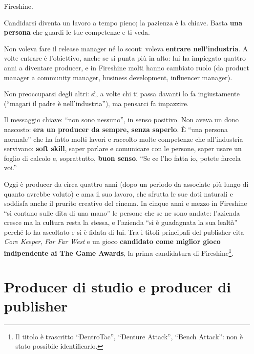 \begin{description}
        Fireshine.
  \item[Non succederà in una notte.] Candidarsi diventa un lavoro a tempo pieno;
        la pazienza è la chiave. Basta \textbf{una persona} che guardi le tue
        competenze e ti veda.
  \item[Sii tattico.] Non voleva fare il release manager né lo scout: voleva
        \textbf{entrare nell'industria}. A volte entrare è l'obiettivo, anche se si
        punta più in alto: lui ha impiegato quattro anni a diventare producer, e in
        Fireshine molti hanno cambiato ruolo (da product manager a community
        manager, business development, influencer manager).
  \item[Non è una gara.] Non preoccuparsi degli altri: sì, a volte chi ti passa
        davanti lo fa ingiustamente (``magari il padre è nell'industria''), ma
        pensarci fa impazzire.
\end{description}

Il messaggio chiave: ``non sono nessuno'', in senso positivo. Non aveva un dono
nascosto: \textbf{era un producer da sempre, senza saperlo}. È ``una persona
normale'' che ha fatto molti lavori e raccolto molte competenze che all'industria
servivano: \textbf{soft skill}, saper parlare e comunicare con le persone, saper
usare un foglio di calcolo e, soprattutto, \textbf{buon senso}. ``Se ce l'ho fatta
io, potete farcela voi.''

Oggi è producer da circa quattro anni (dopo un periodo da associate più lungo di
quanto avrebbe voluto) e ama il suo lavoro, che sfrutta le sue doti naturali e
soddisfa anche il prurito creativo del cinema. In cinque anni e mezzo in Fireshine
``si contano sulle dita di una mano'' le persone che se ne sono andate: l'azienda
cresce ma la cultura resta la stessa, e l'azienda ``si è guadagnata la sua
lealtà'' perché lo ha ascoltato e si è fidata di lui. Tra i titoli principali del
publisher cita \emph{Core Keeper}, \emph{Far Far West} e un gioco
\textbf{candidato come miglior gioco indipendente ai The Game Awards}, la prima
candidatura di Fireshine\footnote{Il titolo è trascritto ``DentroTac'', ``Denture
Attack'', ``Bench Attack'': non è stato possibile identificarlo.}.

\section{Producer di studio e producer di publisher}
\label{sec:c2-2-differenze}


